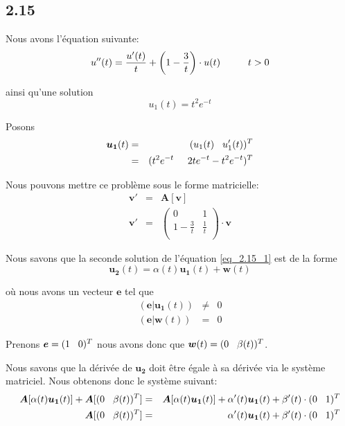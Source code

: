 \documentclass{article}
\begin{document}
\subsection*{2.15}
Nous avons l'équation suivante:
\begin{equation} \label{eq_2.15_1}
u''(t) = \frac{u'(t)}{t} + \left( 1 - \frac{3}{t} \right) \cdot u(t)  \hspace{1 cm } t>0
\end{equation}

ainsi qu'une solution
\begin{equation}
u_1(t) = t^2 e^{-t}
\end{equation}

Posons
\begin{eqnarray}
\bm{u_1}(t) &=& (u_1(t)  \hspace{0.3cm}u_1'(t))^T\\
&=&(t^2 e^{-t} \hspace{0.5cm} 2t e^{-t} -t^2 e^{-t} )^T
\end{eqnarray}



Nous pouvons mettre ce problème sous le forme matricielle:
\begin{eqnarray*}
\bm{v}' &=& \bm{A}[\bm{v}]\\
\bm{v}'&=&\left(
\begin {matrix}
 0&1 \\
 1-\frac{3}{t}&\frac{1}{t} \\
\end{matrix}
\right) \cdot \bm{v}
\end{eqnarray*}

Nous savons que la seconde solution de l'équation \ref{eq_2.15_1} est de la forme
\begin{equation}
\bm{u_2}(t) = \alpha(t) \bm{u_1}(t) + \bm{w}(t)
\end{equation}

où nous avons un vecteur $\bm{e}$ tel que
\begin{eqnarray*}
(\bm{e}|\bm{u_1}(t)) &\neq& 0\\
(\bm{e}|\bm{w}(t))&=&0
\end{eqnarray*}

Prenons $\bm{e}=(1\hspace{0.3cm}0)^T$ nous avons donc que $\bm{w}(t) = (0\hspace{0.3cm}\beta(t))^T$.

Nous savons que la dérivée de $\bm{u_2}$ doit être égale à sa dérivée via le système matriciel. Nous obtenons donc le système suivant:
\begin{eqnarray}
\bm{A}[\alpha(t) \bm{u_1}(t)]+\bm{A}[(0 \hspace{0.3 cm} \beta(t))^T] &=& \bm{A}[\alpha(t)\bm{u_1}(t)] + \alpha'(t)\bm{u_1}(t)+\beta'(t)\cdot (0 \hspace{0.3 cm} 1)^T\\
\bm{A}[(0 \hspace{0.3 cm} \beta(t))^T] &=&  \alpha'(t)\bm{u_1}(t)+\beta'(t)\cdot (0 \hspace{0.3 cm} 1)^T
\end{eqnarray}
\end{document}
